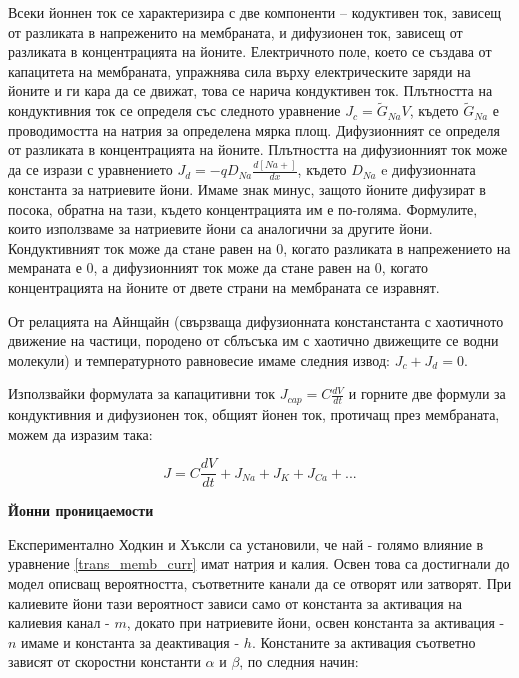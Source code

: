 \documentclass{article}
\numberwithin{equation}{section}
\begin{document}
Всеки йоннен ток се характеризира с две компоненти -- кодуктивен ток, зависещ от разликата в напреженито на мембраната, и дифузионен ток,
зависещ от разликата в концентрацията на йоните. Електричното поле, което се създава от капацитета на мембраната, упражнява сила върху
електрическите заряди на йоните и ги кара да се движат, това се нарича кондуктивен ток. Плътността на кондуктивния ток се определя със
следното уравнение $J_c=\tilde{G}_{Na}V$, където $\tilde{G}_{Na}$ е проводимостта на натрия за определена мярка площ. Дифузионният се
определя от разликата в концентрацията на йоните. Плътността на дифузионният ток може да се изрази с уравнението
$J_d=-qD_{Na}\frac{d[Na+]}{dx}$, където $D_{Na}$ e дифузионната константа за натриевите йони. Имаме знак минус, защото йоните дифузират в
посока, обратна на тази, където концентрацията им е по-голяма. Формулите, които използваме за натриевите йони са аналогични за другите йони.
Кондуктивният ток може да стане равен на 0, когато разликата в напрежението на мемраната е 0, а дифузионният ток може да стане равен на 0,
когато концентрацията на йоните от двете страни на мембраната се изравнят. 

От релацията на Айнщайн (свързваща дифузионната констанстанта с хаотичното движение на частици, породено от сблъсъка им с хаотично движещите
се водни молекули) и температурното равновесие имаме следния извод: $J_c + J_d = 0$.

Използвайки формулата за капацитивни ток $J_{cap}=C\frac{dV}{dt}$ и горните две формули за кондуктивния и дифузионен ток, общият йонен ток, протичащ през мембраната, можем да изразим така:

\begin{equation}\label{trans_memb_curr}
        J = C\frac{dV}{dt} + J_{Na} + J_{K} + J_{Ca} + ...
    \end{equation}

\vspace{5mm} %
\textbf{Йонни проницаемости}

Експериментално Ходкин и Хъксли са установили, че най - голямо влияние в уравнение \eqref{trans_memb_curr} имат натрия и калия. Освен това
са достигнали до модел описващ вероятността, съответните канали да се отворят или затворят. При калиевите йони тази вероятност зависи само
от константа за активация на калиевия канал - $m$, докато при натриевите йони, освен константа за активация - $n$ имаме и константа за
деактивация - $h$. Констаните за активация съответно зависят от скоростни константи $\alpha$ и $\beta$, по следния начин:
\end{document}
